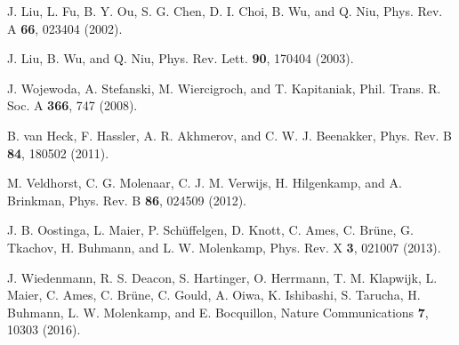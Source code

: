 \documentclass[aps,prl,twocolumn,showpacs,showpacs,10pt,superscriptaddress]{revtex4-1}
\begin{document}
\begin{thebibliography}{00}
 J. Liu, L. Fu, B. Y. Ou, S. G. Chen, D. I. Choi, B. Wu, and Q. Niu, Phys. Rev. A \textbf{66}, 023404 (2002).

 J. Liu, B. Wu, and Q. Niu, Phys. Rev. Lett. \textbf{90}, 170404 (2003).

 J. Wojewoda, A. Stefanski, M. Wiercigroch, and T. Kapitaniak, Phil. Trans. R. Soc. A \textbf{366}, 747 (2008).

 B. van Heck, F. Hassler, A. R. Akhmerov, and C. W. J. Beenakker, Phys. Rev. B \textbf{84}, 180502 (2011).

 M. Veldhorst, C. G. Molenaar, C. J. M. Verwijs, H. Hilgenkamp, and A. Brinkman, Phys. Rev. B \textbf{86}, 024509 (2012).


 J. B. Oostinga, L. Maier, P. Sch{\"{u}}ffelgen, D. Knott, C. Ames, C. Br{\"{u}}ne, G. Tkachov, H. Buhmann, and L. W. Molenkamp, Phys. Rev. X \textbf{3}, 021007 (2013).

 J. Wiedenmann, R. S. Deacon, S. Hartinger, O. Herrmann, T. M. Klapwijk, L. Maier, C. Ames, C. Br\"{u}ne, C. Gould, A. Oiwa, K. Ishibashi, S. Tarucha, H. Buhmann, L. W. Molenkamp, and E. Bocquillon, Nature Communications \textbf{7}, 10303 (2016). 




\end{thebibliography}
\end{document}
